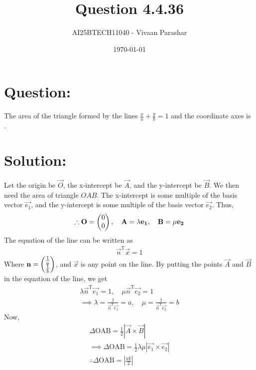 \documentclass[a4paper, 12pt]{article}
\title{Question 4.4.36}
\author{AI25BTECH11040 - Vivaan Parashar}
\date{\today}
\begin{document}
\maketitle

\section{Question: }
The area of the triangle formed by the lines $\frac{x}{a} + \frac{y}{b} = 1$ and the coordinate axes is \underline{\hspace{2cm}}.

\section{Solution: }
Let the origin be $\vec{O}$, the x-intercept be $\vec{A}$, and the y-intercept be $\vec{B}$. We then need the area of triangle $OAB$.
The x-intercept is some multiple of the basis vector $\vec{e_1}$, and the y-intercept is some multiple of the basis vector $\vec{e_2}$. Thus,
\begin{align}
    \therefore \mathbf{O} = \begin{pmatrix}0 \\ 0\end{pmatrix}, \quad \mathbf{A} = \lambda\mathbf{e_1}, \quad \mathbf{B} = \mu\mathbf{e_2}
\end{align}
The equation of the line can be written as
\begin{align}
    \vec{n}^{\mathrm{T}}\vec{x} = 1
\end{align}
Where $\mathbf{n} = \begin{pmatrix}\frac{1}{a} \\ \frac{1}{b}\end{pmatrix}$, and $\vec{x}$ is any point on the line.
By putting the points $\vec{A}$ and $\vec{B}$ in the equation of the line, we get
\begin{align}
    \lambda\vec{n}^{\mathrm{T}}\vec{e_1} = 1, \quad \mu\vec{n}^{\mathrm{T}}\vec{e_2} = 1\\
    \implies \lambda = \frac{1}{\vec{n}^{\mathrm{T}}\vec{e_1}} = a, \quad \mu = \frac{1}{\vec{n}^{\mathrm{T}}\vec{e_2}} = b
\end{align}
Now,
\begin{align}
    \Delta\text{OAB} = \frac{1}{2}\left|\vec{A}\times\vec{B}\right|\\
    \implies \Delta\text{OAB} = \frac{1}{2} \lambda \mu \left|\vec{e_1}\times\vec{e_2}\right|\\
    \therefore \Delta\text{OAB} = \left|\frac{ab}{2}\right|
\end{align}
\end{document}
